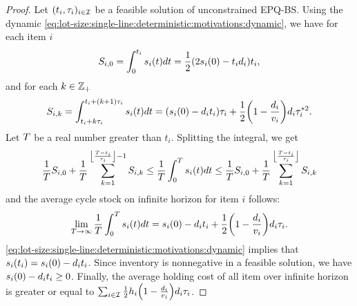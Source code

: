 \begin{proof}
Let $\bracket{t_i,\cover_i}_{i\in\REF}$ be a feasible solution of unconstrained EPQ-BS.
Using the dynamic \eqref{eq:lot-size:single-line:deterministic:motivations:dynamic}, we have for each item $i$
\begin{equation}
  S_{i,0}
  =
  \int_0^{t_i}\inventory_i\bracket{t}dt
  = \frac{1}{2}\bracket{2\inventory_i\bracket{0}-t_i\demand_i}t_i,
\end{equation}
and for each $k\in\mathbb{Z}_+$
\begin{equation}
  S_{i,k}
  =
  \int_{t_i+k\cover_i}^{t_i+\bracket{k+1}\cover_i}\inventory_i(t)dt
  =
  \bracket{\inventory_i(0)-\demand_i t_i}\cover_i
  + \frac{1}{2}\bracket{1-\frac{\demand_i}{\rate_i}}\demand_i\cover_i^{*2}.
\end{equation}
Let $T$ be a real number greater than $t_i$.
Splitting the integral, we get
\begin{equation}
  \frac{1}{\horizon} S_{i,0}
  + \frac{1}{\horizon} \sum_{k=1}^{\left\lfloor\frac{\horizon-t_i}{\cover_i}\right\rfloor-1} S_{i,k}
  \le
  \frac{1}{\horizon} \int_0^{\horizon}\inventory_i\bracket{t}dt
  \le
  \frac{1}{\horizon} S_{i,0}
  + \frac{1}{\horizon} \sum_{k=1}^{\left\lfloor\frac{\horizon-t_i}{\cover_i}\right\rfloor} S_{i,k}
\end{equation}
and the average cycle stock on infinite horizon for item $i$ follows:
\begin{equation}
  \lim_{\horizon\rightarrow\infty} \frac{1}{\horizon} \int_0^{\horizon}\inventory_i\bracket{t}dt
  =
  \inventory_i(0)-\demand_i t_i
  + \frac{1}{2}\bracket{1-\frac{\demand_i}{\rate_i}}\demand_i\cover_i.
\end{equation}
\cref{eq:lot-size:single-line:deterministic:motivations:dynamic} implies that $\inventory_i\bracket{t_i}=\inventory_i(0)-\demand_i t_i$.
Since inventory is nonnegative in a feasible solution, we have $s_i(0)-d_i t_i\ge0$.
Finally, the average holding cost of all item over infinite horizon is greater or equal to
$\sum_{i\in\REF}\frac{1}{2}\holding_i\bracket{1-\frac{\demand_i}{\rate_i}}\demand_i\cover_i$.
\end{proof}





